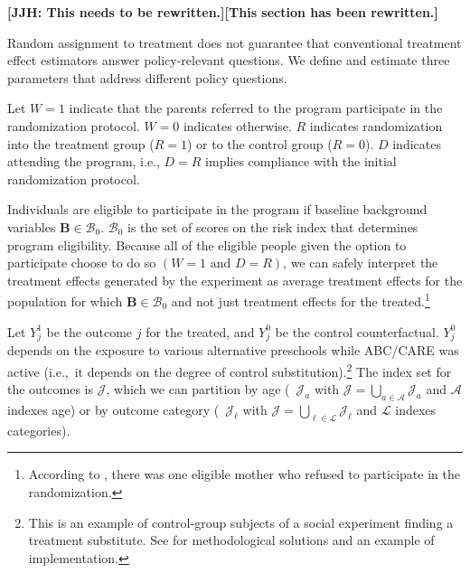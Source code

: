 \textbf{[JJH: This needs to be rewritten.][This section has been rewritten.]}

Random assignment to treatment does not guarantee that conventional treatment effect estimators answer policy-relevant questions. We define and estimate three parameters that address different policy questions.

Let $W=1$ indicate that the parents referred to the program participate in the randomization protocol. $W=0$ indicates otherwise. $R$ indicates randomization into the treatment group ($R = 1$) or to the control group ($R = 0$). $D$ indicates attending the program, i.e., $D = R$ implies compliance with the initial randomization protocol.

Individuals are eligible to participate in the program if baseline background variables $\bm{B}\in\mathcal{B}_0$. $\mathcal{B}_0$ is the set of scores on the risk index that determines program eligibility. Because all of the eligible people given the option to participate choose to do so $(W=1\text{ and } D=R)$, we can safely interpret the treatment effects generated by the experiment as average treatment effects for the population for which $\bm{B}\in\mathcal{B}_0$ and not just treatment effects for the treated.\footnote{According to \citet{Ramey_Yeates_Short_1984_CD}, there was one eligible mother who refused to participate in the randomization.}

Let $Y^1_{j}$ be the outcome $j$ for the treated, and $Y^0_{j}$ be the control counterfactual. $Y^0_{j}$ depends on the exposure to various alternative preschools while ABC/CARE was active (i.e.,\ it depends on the degree of control substitution).\footnote{This is an example of control-group subjects of a social experiment finding a treatment substitute. See \cite{Heckman_Hohmann_etal_2000_QJE} for methodological solutions and an example of implementation.} The index set for the outcomes is $\mathcal{J}$, which we can partition by age (\ $\mathcal{J}_a$ with $\mathcal{J} = \bigcup \limits _{a \in \mathcal{A}} \mathcal{J}_a$ and $\mathcal{A}$ indexes age) or by outcome category (\ $\mathcal{J}_\ell$ with $\mathcal{J} = \bigcup \limits _{\ell \in \mathcal{L}} \mathcal{J}_\ell$ and $\mathcal{L}$ indexes categories). 


